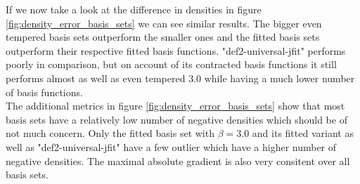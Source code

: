 If we now take a look at the difference in densities in figure \ref{fig:density_error_basis_sets} we can see similar results. The bigger even tempered basis sets outperform the smaller ones and the fitted basis sets outperform their respective fitted basis functions. "def2-universal-jfit" performs poorly in comparison, but on account of its contracted basis functions it still performs almost as well as even tempered 3.0 while having a much lower number of basis functions.\\
The additional metrics in figure \ref{fig:density_error_basis_sets} show that most basis sets have a relatively low number of negative densities which should be of not much concern. Only the fitted basis set with $\beta = 3.0$ and its fitted variant as well as "def2-universal-jfit" have a few outlier which have a higher number of negative densities. The maximal absolute gradient is also very consitent over all basis sets.\\
